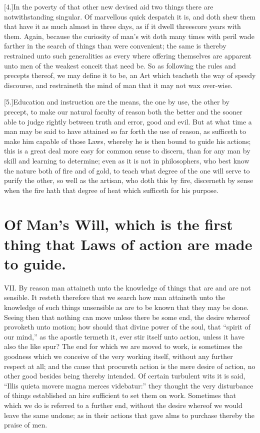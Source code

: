 [4.]In the poverty of that other new devised aid two  things there are notwithstanding singular. Of marvellous quick despatch it is, and doth shew them that have it as much almost in three days, as if it dwell threescore years with them. Again, because the curiosity of man’s wit doth many times with peril wade farther in the search of things than were convenient; the same is thereby restrained unto such generalities as every where offering themselves are apparent unto men of the weakest conceit that need be. So as following the rules and precepts thereof, we may define it to be, an Art which teacheth the way of speedy discourse, and restraineth the mind of man that it may not wax over-wise.

[5.]Education and instruction are the means, the one by use, the other by precept, to make our natural faculty of reason both the better and the sooner able to judge rightly between truth and error, good and evil. But at what time a man may be said to have attained so far forth the use of reason, as sufficeth to make him capable of those Laws, whereby he is then bound to guide his actions; this is a great deal more easy for common sense to discern, than for any man by skill and learning to determine; even as it is not in philosophers, who best know the nature both of fire and of gold, to teach what degree of the one will serve to purify the other, so well as the artisan, who doth this by fire, discerneth by sense when the fire hath that degree of heat which sufficeth for his purpose.

\section*{Of Man’s Will, which is the first thing that Laws of action are made to guide.}

VII. By reason man attaineth unto the knowledge of things that are and are not sensible. It resteth therefore that we search how man attaineth unto the knowledge of such things unsensible as are to be known that they may be done. Seeing then that nothing can move unless there be  some end, the desire whereof provoketh unto motion; how should that divine power of the soul, that “spirit of our mind,” as the apostle termeth it, ever stir itself unto action, unless it have also the like spur? The end for which we are moved to work, is sometimes the goodness which we conceive of the very working itself, without any further respect at all; and the cause that procureth action is the mere desire of action, no other good besides being thereby intended. Of certain turbulent wits it is said, “Illis quieta movere magna merces videbatur:” they thought the very disturbance of things established an hire sufficient to set them on work. Sometimes that which we do is referred to a further end, without the desire whereof we would leave the same undone; as in their actions that gave alms to purchase thereby the praise of men.

